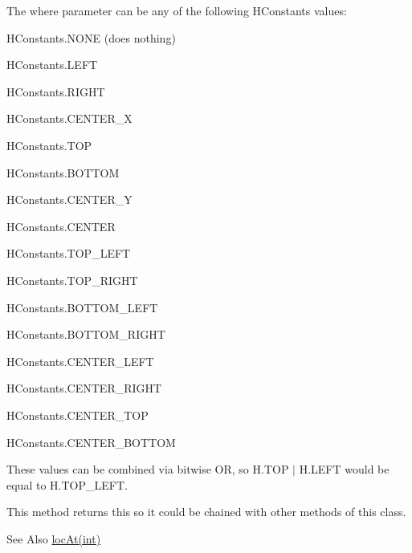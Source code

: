 The {\ttfamily where} parameter can be any of the following H\-Constants values\-:
\begin{DoxyItemize}
\item {\ttfamily H\-Constants.\-N\-O\-N\-E} (does nothing)
\item {\ttfamily H\-Constants.\-L\-E\-F\-T}
\item {\ttfamily H\-Constants.\-R\-I\-G\-H\-T}
\item {\ttfamily H\-Constants.\-C\-E\-N\-T\-E\-R\-\_\-\-X}
\item {\ttfamily H\-Constants.\-T\-O\-P}
\item {\ttfamily H\-Constants.\-B\-O\-T\-T\-O\-M}
\item {\ttfamily H\-Constants.\-C\-E\-N\-T\-E\-R\-\_\-\-Y}
\item {\ttfamily H\-Constants.\-C\-E\-N\-T\-E\-R}
\item {\ttfamily H\-Constants.\-T\-O\-P\-\_\-\-L\-E\-F\-T}
\item {\ttfamily H\-Constants.\-T\-O\-P\-\_\-\-R\-I\-G\-H\-T}
\item {\ttfamily H\-Constants.\-B\-O\-T\-T\-O\-M\-\_\-\-L\-E\-F\-T}
\item {\ttfamily H\-Constants.\-B\-O\-T\-T\-O\-M\-\_\-\-R\-I\-G\-H\-T}
\item {\ttfamily H\-Constants.\-C\-E\-N\-T\-E\-R\-\_\-\-L\-E\-F\-T}
\item {\ttfamily H\-Constants.\-C\-E\-N\-T\-E\-R\-\_\-\-R\-I\-G\-H\-T}
\item {\ttfamily H\-Constants.\-C\-E\-N\-T\-E\-R\-\_\-\-T\-O\-P}
\item {\ttfamily H\-Constants.\-C\-E\-N\-T\-E\-R\-\_\-\-B\-O\-T\-T\-O\-M}
\end{DoxyItemize}

These values can be combined via bitwise O\-R, so {\ttfamily H.\-T\-O\-P $|$ H.\-L\-E\-F\-T} would be equal to {\ttfamily H.\-T\-O\-P\-\_\-\-L\-E\-F\-T}.

This method returns {\ttfamily this} so it could be chained with other methods of this class. \begin{DoxySeeAlso}{See Also}
\hyperlink{classhype_1_1core_1_1drawable_1_1_h_drawable_aef563dc604bba62673085b2e50764c5c}{loc\-At(int)} 
\end{DoxySeeAlso}

